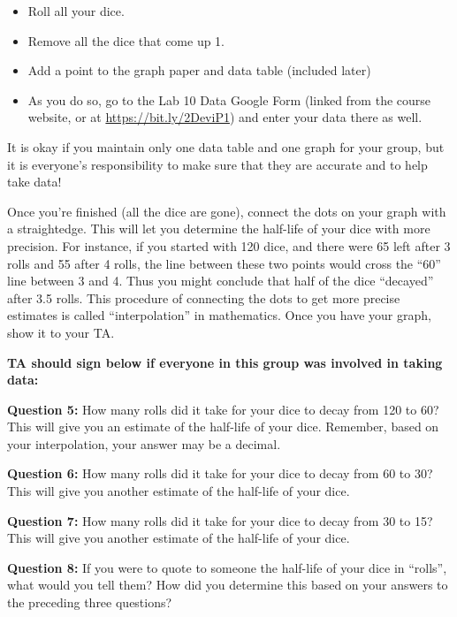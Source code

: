 \documentclass[11pt]{article}
\begin{document}
\begin{itemize}
\item Roll all your dice.
\item Remove all the dice that come up 1.
\item Add a point to the graph paper and data table (included later) 
\item As you do so, go to the Lab 10 Data Google Form (linked from the course website, or at \url{https://bit.ly/2DeviP1}) and enter your data there as well.
\end{itemize}

It is okay if you maintain only one data table and one graph for your group, but it is everyone's responsibility to make sure that they are accurate and to help take data!

Once you're finished (all the dice are gone), connect the dots on your graph with a straightedge. This will let you determine the half-life of your dice with more precision. For instance, if you started with 120 dice, and there were 65 left after 3 rolls and 55 after 4 rolls,
the line between these two points would cross the ``60'' line between 3 and 4. Thus you might conclude that half of the dice ``decayed'' after 3.5 rolls. This procedure of connecting the dots to get more precise estimates is called 
``interpolation'' in mathematics. Once you have your graph, show it to your TA.

{\bf TA should sign below if everyone in this group was involved in taking data:}



\newpage
{\bf Question 5:} How many rolls did it take for your dice to decay from 120 to 60? This will give you an estimate of the half-life of your dice. Remember, based on your interpolation, your answer may be a decimal.

\vspace{1.1in}

{\bf Question 6:} How many rolls did it take for your dice to decay from 60 to 30? This will give you another estimate of the half-life of your dice.


\vspace{1.1in}

{\bf Question 7:} How many rolls did it take for your dice to decay from 30 to 15? This will give you another estimate of the half-life of your dice.


\vspace{1.1in}

{\bf Question 8:} If you were to quote to someone the half-life of your dice in ``rolls'', what would you tell them? How did you determine this based on your answers to the preceding three questions?
\end{document}
